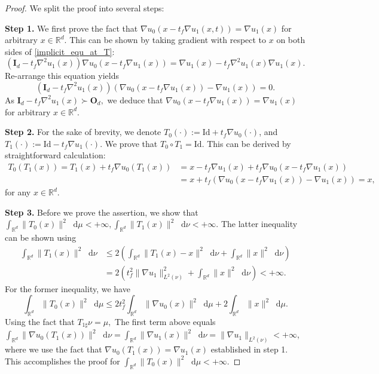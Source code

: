 \documentclass{article} %
\theoremstyle{plain}
\theoremstyle{definition}
\theoremstyle{remark}
\newcommand*\diff{\mathop{}\!\mathrm{d}}
\begin{document}
\begin{proof}
We split the proof into several steps:

\textbf{Step 1.} We first prove the fact that $\nabla u_0(x - t_f\nabla u_1(x, t)) = \nabla u_1(x)$ for arbitrary $x\in\mathbb{R}^d$. This can be shown by taking gradient with respect to $x$ on both sides of \eqref{implicit_equ_at_T}:
\begin{equation*}
  (\textbf{I}_d - t_f\nabla^2 u_1(x)) \nabla u_0(x - t_f \nabla u_1(x)) = \nabla u_1(x) - t_f \nabla^2 u_1(x) \nabla u_1(x).
\end{equation*}
Re-arrange this equation yields
\begin{equation*}
  (\textbf{I}_d -t_f\nabla^2 u_1(x)) (\nabla u_0(x - t_f \nabla u_1(x)) - \nabla u_1(x)) = 0.
\end{equation*}
As $\textbf{I}_d-t_f\nabla^2 u_1(x)\succ \textbf{O}_d,$ we deduce that $\nabla u_0(x - t_f \nabla u_1(x)) = \nabla u_1(x)$ for arbitrary $x\in\mathbb{R}^d$.

\textbf{Step 2.} For the sake of brevity, we denote  $T_0(\cdot):=\mathrm{Id} + t_f \nabla u_0(\cdot)$, and $T_1(\cdot):=\mathrm{Id} - t_f\nabla u_1(\cdot)$. We prove that $T_0\circ T_1 = \mathrm{Id}$. This can be derived by straightforward calculation:
\begin{align*}
  T_0(T_1(x)) = T_1(x) + t_f\nabla u_0(T_1(x)) & =  x - t_f \nabla u_1(x) + t_f\nabla u_0(x - t_f \nabla u_1(x))  \\
  & = x + t_f(\nabla u_0(x - t_f \nabla u_1(x)) - \nabla u_1(x)) = x,
\end{align*}
for any $x \in \mathbb{R}^d$.

\textbf{Step 3.} Before we prove the assertion, we show that $\int_{\mathbb{R}^d} \|T_0(x)\|^2 \diff \mu < +\infty, \int_{\mathbb{R}^d} \|T_1(x)\|^2 \diff \nu < +\infty.$ The latter inequality can be shown using
\begin{align*}
  \int_{\mathbb{R}^d} \|T_1(x)\|^2 \diff \nu & \leq  2\left(\int_{\mathbb{R}^d} \|T_1(x) - x\|^2 \diff \nu + \int_{\mathbb{R}^d} \|x\|^2 \diff \nu\right) \\
  & =  2(t_f^2\|\nabla u_1\|_{L^2(\nu)}^2 + \int_{\mathbb{R}^d} \|x\|^2 \diff \nu) < +\infty.
\end{align*}
For the former inequality, we have
\begin{equation*}
  \int_{\mathbb{R}^d} \|T_0(x)\|^2 \diff \mu \leq %
  2 t_f^2\int_{\mathbb{R}^d} \|\nabla u_0(x)\|^2 \diff \mu + 2 \int_{\mathbb{R}^d} \|x\|^2 \diff \mu.
\end{equation*}
Using the fact that $T_{1\sharp}\nu = \mu,$ The first term above equals $\int_{\mathbb{R}^d} \|\nabla u_0(T_1(x))\|^2\diff \nu = \int_{\mathbb{R}^d} \|\nabla u_1(x)\|^2\diff \nu = \|\nabla u_1\|_{L^2(\nu)}<+\infty$, where we use the fact that $\nabla u_0(T_1(x)) = \nabla u_1(x)$ established in step 1. This accomplishes the proof for $\int_{\mathbb{R}^d} \|T_0(x)\|^2 \diff \mu < + \infty$.


\end{proof}
\end{document}
